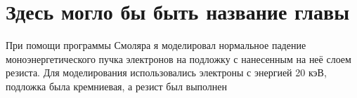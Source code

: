 \chapter{Здесь могло бы быть название главы}
При помощи программы Смоляра я моделировал нормальное падение моноэнергетического пучка электронов на подложку с нанесенным на неё слоем резиста. Для моделирования использовались электроны с энергией 20 кэВ, подложка была кремниевая, а резист был выполнен 